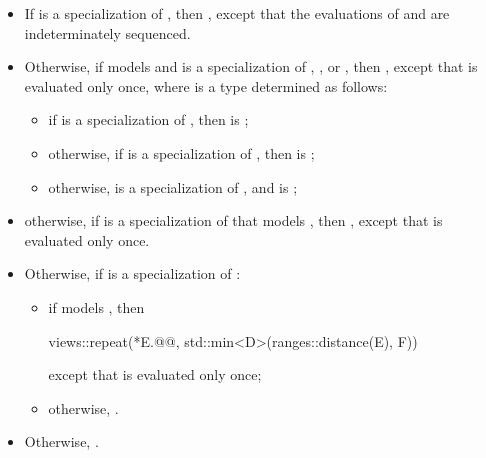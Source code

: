 \begin{itemize}
\item
If  is a specialization
of ,
then ,
except that the evaluations of  and 
are indeterminately sequenced.

\item
Otherwise, if  models
and is a specialization of
,
, or
,
then
,
except that  is evaluated only once,
where  is a type determined as follows:

\begin{itemize}
\item if  is a specialization of ,
then  is ;
\item otherwise, if  is a specialization of ,
then  is ;
\item otherwise,  is a specialization of , and
 is ;
\end{itemize}

\item
otherwise, if  is
a specialization of 
that models ,
then
,
except that  is evaluated only once.

\item
Otherwise, if  is
a specialization of :
\begin{itemize}
\item
if  models ,
then
\begin{codeblock}
views::repeat(*E.@@, std::min<D>(ranges::distance(E), F))
\end{codeblock}
except that  is evaluated only once;
\item
otherwise, .
\end{itemize}

\item
Otherwise, .
\end{itemize}

